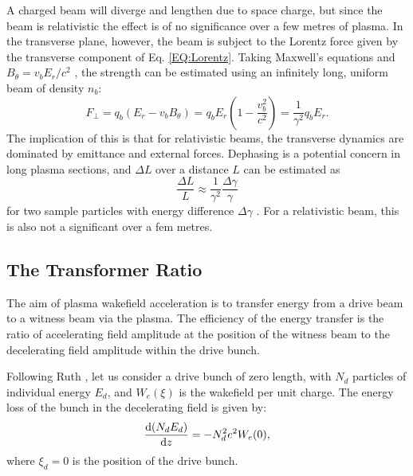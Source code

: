 A charged beam will diverge and lengthen due to space charge, but since the beam is relativistic the effect is of no significance over a few metres of plasma. In the transverse plane, however, the beam is subject to the Lorentz force given by the transverse component of Eq. \ref{EQ:Lorentz}. Taking Maxwell's equations and $B_{\theta} = v_{b}E_{r}/c^{2}$ \cite{schindl:1999}, the strength can be estimated using an infinitely long, uniform beam of density $n_{b}$:
\begin{equation}
    F_{\perp} = q_{b}(E_{r} - v_{b}B_{\theta})
              = q_{b}E_{r}\left(1 - \frac{v_{b}^{2}}{c^{2}}\right)
              = \frac{1}{\gamma^2}q_{b}E_{r}. \label{EQ:DeFocR}
\end{equation}
The implication of this is that for relativistic beams, the transverse dynamics are dominated by emittance and external forces. Dephasing is a potential concern in long plasma sections, and $\Delta L$ over a distance $L$ can be estimated as
\begin{equation}
    \frac{\Delta L}{L} \approx \frac{1}{\gamma^{2}}\frac{\Delta\gamma}{\gamma} \label{EQ:DePhL}
\end{equation}
for two sample particles with energy difference $\Delta\gamma$ \cite{muggli:2017}. For a relativistic beam, this is also not a significant over a fem metres.

\subsection{The Transformer Ratio}
\label{Int:BPI:TRat}

The aim of plasma wakefield acceleration is to transfer energy from a drive beam to a witness beam via the plasma. The efficiency of the energy transfer is the ratio of accelerating field amplitude at the position of the witness beam to the decelerating field amplitude within the drive bunch.

Following Ruth \etal \cite{ruth:1985}, let us consider a drive bunch of zero length, with $N_{d}$ particles of individual energy $E_{d}$, and $W_{e}(\xi)$ is the wakefield per unit charge. The energy loss of the bunch in the decelerating field is given by:
\begin{equation}
    \frac{\mathrm{d} (N_{d}E_{d})}{\mathrm{d} z} = - N_{d}^{2}e^{2}W_{e}(0), \label{EQ:TRat:Drive}
\end{equation}
where $\xi_{d} = 0$ is the position of the drive bunch.

